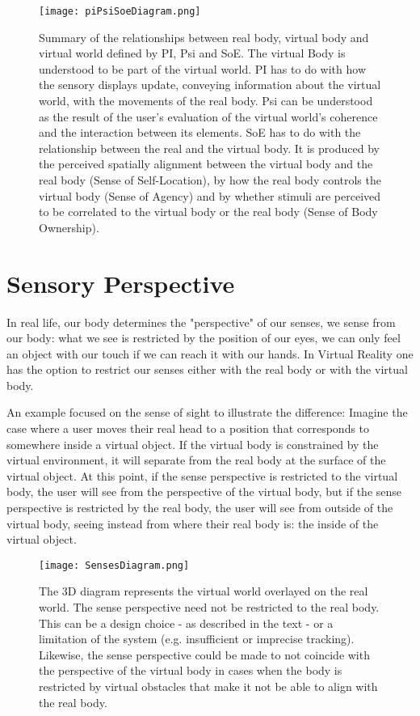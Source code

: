 \begin{figure}[h]
\centering
\texttt{[image: piPsiSoeDiagram.png]}
\caption{Summary of the relationships between real body, virtual body and virtual world defined by PI, Psi and SoE. The virtual Body is understood to be part of the virtual world. PI has to do with how the sensory displays update, conveying information about the virtual world, with the movements of the real body. Psi can be understood as the result of the user's evaluation of the virtual world's coherence and the interaction between its elements. SoE has to do with the relationship between the real and the virtual body. It is produced by the perceived spatially alignment between the virtual body and the real body (Sense of Self-Location), by how the real body controls the virtual body (Sense of Agency) and by whether stimuli are perceived to be correlated to the virtual body or the real body (Sense of Body Ownership).}
\label{fig:piPsiSoeDiagram}
\end{figure}

\section{Sensory Perspective}
\label{sec:sensoryPerspective}

In real life, our body determines the "perspective" of our senses, we sense from our body: what we see is restricted by the position of our eyes, we can only feel an object with our touch if we can reach it with our hands. In Virtual Reality one has the option to restrict our senses either with the real body or with the virtual body.

An example focused on the sense of sight to illustrate the difference: Imagine the case where a user moves their real head to a position that corresponds to somewhere inside a virtual object. If the virtual body is constrained by the virtual environment, it will separate from the real body at the surface of the virtual object. At this point, if the sense perspective is restricted to the virtual body, the user will see from the perspective of the virtual body, but if the sense perspective is restricted by the real body, the user will see from outside of the virtual body, seeing instead from where their real body is: the inside of the virtual object.

\begin{figure}[h]
\centering
\texttt{[image: SensesDiagram.png]}
\caption{The 3D diagram represents the virtual world overlayed on the real world. The sense perspective need not be restricted to the real body. This can be a design choice - as described in the text - or a limitation of the system (e.g. insufficient or imprecise tracking). Likewise, the sense perspective could be made to not coincide with the perspective of the virtual body in cases when the body is restricted by virtual obstacles that make it not be able to align with the real body.}
\label{fig:sensesDiagram}
\end{figure}

